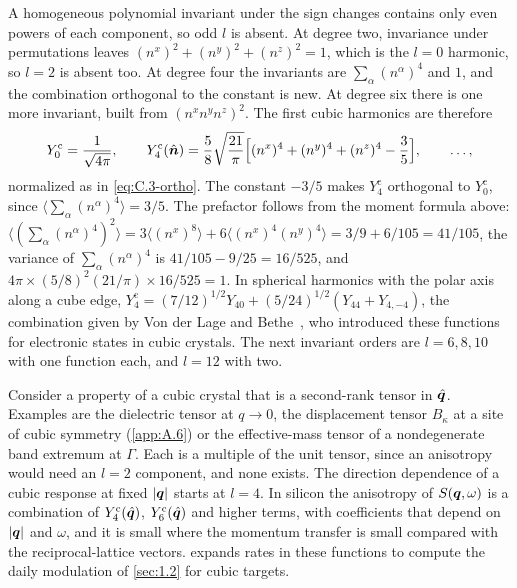 A homogeneous polynomial invariant under the sign changes contains only even powers of each component, so odd $l$ is absent. At degree two, invariance under permutations leaves $(n^x)^2 + (n^y)^2 + (n^z)^2 = 1$, which is the $l = 0$ harmonic, so $l = 2$ is absent too. At degree four the invariants are $\sum_\alpha(n^\alpha)^4$ and $1$, and the combination orthogonal to the constant is new. At degree six there is one more invariant, built from $(n^xn^yn^z)^2$. The first cubic harmonics are therefore
\begin{equation}
  Y^{\mathrm{c}}_0 = \frac{1}{\sqrt{4\pi}}, \qquad
  Y^{\mathrm{c}}_4(\hat{\bm{n}}) = \frac58\sqrt{\frac{21}{\pi}}\Bigl[(n^x)^4 + (n^y)^4 + (n^z)^4 - \frac35\Bigr], \qquad \dots ,
  \label{eq:C.3-cubic}
\end{equation}
normalized as in \cref{eq:C.3-ortho}. The constant $-3/5$ makes $Y^{\mathrm{c}}_4$ orthogonal to $Y^{\mathrm{c}}_0$, since $\langle\sum_\alpha(n^\alpha)^4\rangle = 3/5$. The prefactor follows from the moment formula above: $\langle(\sum_\alpha(n^\alpha)^4)^2\rangle = 3\langle(n^x)^8\rangle + 6\langle(n^x)^4(n^y)^4\rangle = 3/9 + 6/105 = 41/105$, the variance of $\sum_\alpha(n^\alpha)^4$ is $41/105 - 9/25 = 16/525$, and $4\pi\times(5/8)^2(21/\pi)\times16/525 = 1$. In spherical harmonics with the polar axis along a cube edge, $Y^{\mathrm{c}}_4 = (7/12)^{1/2}Y_{40} + (5/24)^{1/2}(Y_{44} + Y_{4,-4})$, the combination given by Von der Lage and Bethe~\cite{vonderlage1947method}, who introduced these functions for electronic states in cubic crystals. The next invariant orders are $l = 6, 8, 10$ with one function each, and $l = 12$ with two.

Consider a property of a cubic crystal that is a second-rank tensor in $\hat{\bm{q}}$. Examples are the dielectric tensor at $q \to 0$, the displacement tensor $B_\kappa$ at a site of cubic symmetry (\cref{app:A.6}) or the effective-mass tensor of a nondegenerate band extremum at $\Gamma$. Each is a multiple of the unit tensor, since an anisotropy would need an $l = 2$ component, and none exists. The direction dependence of a cubic response at fixed $|\bm{q}|$ starts at $l = 4$. In silicon the anisotropy of $S(\bm{q},\omega)$ is a combination of $Y^{\mathrm{c}}_4(\hat{\bm{q}})$, $Y^{\mathrm{c}}_6(\hat{\bm{q}})$ and higher terms, with coefficients that depend on $|\bm{q}|$ and $\omega$, and it is small where the momentum transfer is small compared with the reciprocal-lattice vectors.  expands rates in these functions to compute the daily modulation of \cref{sec:1.2} for cubic targets.
